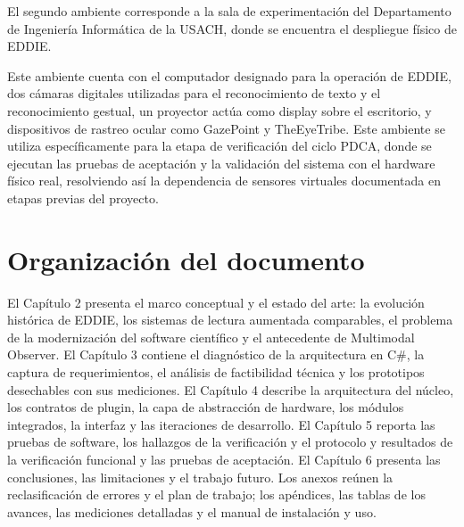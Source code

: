 El segundo ambiente corresponde a la sala de experimentación del Departamento de Ingeniería Informática de la USACH, donde se encuentra el despliegue físico de EDDIE.

Este ambiente cuenta con el computador designado para la operación de EDDIE, dos cámaras digitales utilizadas para el reconocimiento de texto y el reconocimiento gestual, un proyector actúa como display sobre el escritorio, y dispositivos de rastreo ocular como GazePoint y TheEyeTribe. Este ambiente se utiliza específicamente para la etapa de verificación del ciclo PDCA, donde se ejecutan las pruebas de aceptación y la validación del sistema con el hardware físico real, resolviendo así la dependencia de sensores virtuales documentada en etapas previas del proyecto.

\section{Organizaci\'on del documento}
\label{intro:organizacion}

El Capítulo 2 presenta el marco conceptual y el estado del arte: la evolución histórica de EDDIE, los sistemas de lectura aumentada comparables, el problema de la modernización del software científico y el antecedente de Multimodal Observer. El Capítulo 3 contiene el diagnóstico de la arquitectura en C\#, la captura de requerimientos, el análisis de factibilidad técnica y los prototipos desechables con sus mediciones. El Capítulo 4 describe la arquitectura del núcleo, los contratos de plugin, la capa de abstracción de hardware, los módulos integrados, la interfaz y las iteraciones de desarrollo. El Capítulo 5 reporta las pruebas de software, los hallazgos de la verificación y el protocolo y resultados de la verificación funcional y las pruebas de aceptación. El Capítulo 6 presenta las conclusiones, las limitaciones y el trabajo futuro. Los anexos reúnen la reclasificación de errores y el plan de trabajo; los apéndices, las tablas de los avances, las mediciones detalladas y el manual de instalación y uso.


